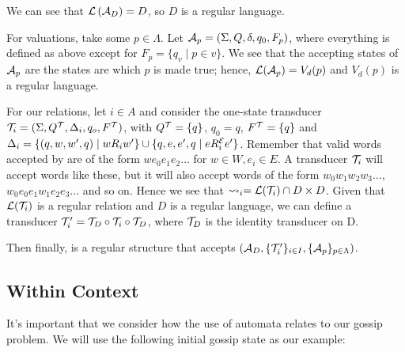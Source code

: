 \documentclass[12pt, a4paper]{article} %
\begin{document}
\bigskip

We can see that $\mathcal{L}\left(\mathcal{A}_D\right) = D$, so $D$ is a regular language.

For valuations, take some $p \in \Lambda$. Let $\mathcal{A}_p = (\Sigma, Q, \delta, q_0, F_p)$, where everything is defined as above except for $F_p = \{q_v \mid p \in v\}$. We see that the accepting states of $\mathcal{A}_p$ are the states are which $p$ is made true; hence, $\mathcal{L}(\mathcal{A}_p) = V_d(p)$ and $V_d(p)$ is a regular language.

For our relations, let $i \in A$ and consider the one-state transducer $\mathcal{T}_i = (\Sigma, Q^{\mathcal{T}}, \Delta_i, q_o, F^{\mathcal{T}})$, with $Q^{\mathcal{T}} = \{q\}$, $q_0 = q$, $F^{\mathcal{T}} = \{q\}$ and $\Delta_i = \{(q, w, w', q) \mid w R_i w'\} \cup \{q, e, e', q \mid e R^{\mathcal{E}}_i e'\}$. Remember that valid words accepted by  are of the form $we_0e_1e_2\ldots$ for $w \in W, e_i \in E$. A transducer $\mathcal{T}_i$ will accept words like these, but it will also accept words of the form $w_0w_1w_2w_3\ldots$, $w_0e_0e_1w_1e_2e_3\ldots$ and so on. Hence we see that $\rightsquigarrow_i = \mathcal{L}(\mathcal{T}_i) \cap D \times D$. Given that $\mathcal{L}(\mathcal{T}_i)$ is a regular relation and $D$ is a regular language, we can define a transducer $\mathcal{T}'_i = \mathcal{T}_D \circ \mathcal{T}_i \circ \mathcal{T}_D$, where $\mathcal{T}_D$ is the identity transducer on D.

Then finally,  is a regular structure that accepts $\left(\mathcal{A}_D, \{\mathcal{T}'_i\}_{i \in I}, \{\mathcal{A}_p\}_{p \in \Lambda}\right)$.

\subsection{Within Context}
\label{"subsection:withincontext"}

It's important that we consider how the use of automata relates to our gossip problem. We will use the following initial gossip state as our example:

\begin{center}
\end{center}
\end{document}
